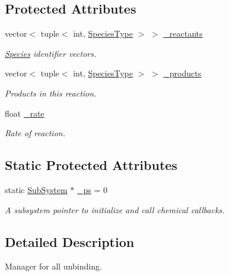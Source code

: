 \subsection*{Protected Attributes}
\begin{DoxyCompactItemize}
\item 
vector$<$ tuple$<$ int, \hyperlink{Species_8h_a50651af47c56ea0e27235468d23542cf}{Species\+Type} $>$ $>$ \hyperlink{classInternalFilamentRxnManager_a63de9061c3da4ad03cf4c530d2774979}{\+\_\+reactants}
\begin{DoxyCompactList}\small\item\em \hyperlink{classSpecies}{Species} identifier vectors. \end{DoxyCompactList}\item 
vector$<$ tuple$<$ int, \hyperlink{Species_8h_a50651af47c56ea0e27235468d23542cf}{Species\+Type} $>$ $>$ \hyperlink{classInternalFilamentRxnManager_afd213da1a3706e2e88962e5da886a5dc}{\+\_\+products}
\begin{DoxyCompactList}\small\item\em Products in this reaction. \end{DoxyCompactList}\item 
float \hyperlink{classInternalFilamentRxnManager_a8b98dd9e6f5d016149f5434b891806df}{\+\_\+rate}
\begin{DoxyCompactList}\small\item\em Rate of reaction. \end{DoxyCompactList}\end{DoxyCompactItemize}
\subsection*{Static Protected Attributes}
\begin{DoxyCompactItemize}
\item 
static \hyperlink{classSubSystem}{Sub\+System} $\ast$ \hyperlink{classInternalFilamentRxnManager_a973ce9cc2aae811e6867afa46193c5f2}{\+\_\+ps} = 0
\begin{DoxyCompactList}\small\item\em A subsystem pointer to initialize and call chemical callbacks. \end{DoxyCompactList}\end{DoxyCompactItemize}


\subsection{Detailed Description}
Manager for all unbinding. 

